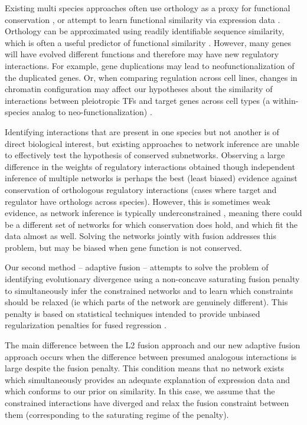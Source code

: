 \documentclass[11pt]{article}
\begin{document}
Existing multi species approaches often use orthology as a proxy for functional conservation \cite{roy_arboretum:_2013, penfold_inferring_2015, joshi_multi-species_2015, kashima_simultaneous_2009, zhang2010nearly}, or attempt to learn functional similarity via expression data \cite{gholami_cross-species_2010}. 
Orthology can be approximated using readily identifiable sequence similarity, which is often a useful predictor of functional similarity \cite{wilson_assessing_2000, jensen_eggnog:_2008}. However, many genes will have evolved different functions and therefore may have new regulatory interactions. For example, gene duplications may lead to neofunctionalization \cite{eisen_phylogenomics:_1998} of the duplicated genes. Or, when comparing regulation across cell lines, changes in chromatin configuration may affect our hypotheses about the similarity of interactions between pleiotropic TFs and target genes across cell types (a within-species analog to neo-functionalization) \cite{li_role_2007}. 


Identifying interactions that are present in one species but not another is of direct biological interest, but existing approaches to network inference are unable to effectively test the hypothesis of conserved subnetworks. Observing a large difference in the weights of regulatory interactions obtained though independent inference of multiple networks is perhaps the best (least biased) evidence against conservation of orthologous regulatory interactions (cases where target and regulator have orthologs across species). However, this is sometimes weak evidence, as network inference is typically underconstrained \cite{marbach_revealing_2010}, meaning there could be a different set of networks for which conservation does hold, and which fit the data almost as well. Solving the networks jointly with fusion addresses this problem, but may be biased when gene function is not conserved. 

Our second method -- adaptive fusion -- attempts to solve the problem of identifying evolutionary divergence using a non-concave saturating fusion penalty to simultaneously infer the constrained networks and to learn which constraints should be relaxed (ie which parts of the network are genuinely different). This penalty is based on statistical techniques intended to provide unbiased regularization penalties for fused regression \cite{zhang2010nearly, fan2001variable}.

The main difference between the L2 fusion approach and our new adaptive fusion approach occurs when the difference between presumed analogous interactions is large despite the fusion penalty. This condition means that no network exists which simultaneously provides an adequate explanation of expression data and which conforms to our prior on similarity. In this case, we assume that the constrained interactions have diverged and relax the fusion constraint between them (corresponding to the saturating regime of the penalty).
\end{document}
